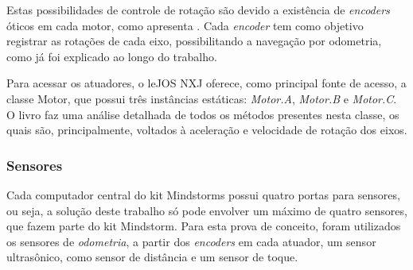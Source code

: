 		Estas possibilidades de controle de rotação são devido a existência de \textit{encoders} óticos em cada motor, como apresenta \cite{legonxj}. Cada \textit{encoder} tem como objetivo registrar as rotações de cada eixo, possibilitando a navegação por odometria, como já foi explicado ao longo do trabalho.

		Para acessar os atuadores, o leJOS NXJ oferece, como principal fonte de acesso, a classe Motor, que possui três instâncias estáticas: \textit{Motor.A}, \textit{Motor.B} e \textit{Motor.C}. O livro \cite{legonxj} faz uma análise detalhada de todos os métodos presentes nesta classe, os quais são, principalmente, voltados à aceleração e velocidade de rotação dos eixos.

	\subsubsection{Sensores}

		Cada computador central do kit Mindstorms possui quatro portas para sensores, ou seja, a solução deste trabalho só pode envolver um máximo de quatro sensores, que fazem parte do kit Mindstorm. Para esta prova de conceito, foram utilizados os sensores de \textit{odometria}, a partir dos \textit{encoders} em cada atuador, um sensor ultrasônico, como sensor de distância e um sensor de toque.

